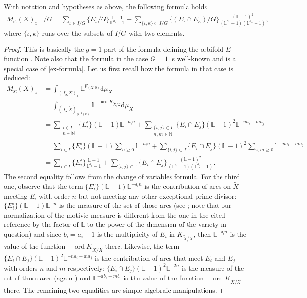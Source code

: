 \documentclass[12pt]{amsart}
\theoremstyle{plain}   %
\theoremstyle{definition}    %
\theoremstyle{remark}    %
\numberwithin{equation}{theorem}
\DeclareMathOperator{\st}{\mathrm{st}}
\DeclareMathOperator{\ord}{{ord}}
\newcommand{\bL}{\mathbb{L}}
\newcommand{\bN}{\mathbb{N}}
\begin{document}
\begin{lemma} \label{lem.SurfaceCaseDescription}
With notation and hypotheses as above, the following formula holds
\begin{align*}
M_{\st}(X)_x & /G=\sum_{\iota\in I/G}\{E_{\iota}^{\circ}/G\}\frac{\bL-1}{\bL^{a_{\iota}}-1}+\sum_{\{\iota,\kappa\}\subset I/G}\{(E_{\iota}\cap E_{\kappa}) /G\}\frac{(\bL-1)^{2}}{(\bL^{a_{\iota}}-1)(\bL^{a_{\kappa}}-1)},
\end{align*}
where $\{\iota,\kappa\}$ runs over the subsets of $I/G$ with two elements.
\end{lemma}
\begin{proof}
This is basically the $g=1$ part of the formula defining the orbifold
$E$-function \cite[Definition 6.3]{batyrevNonArchimedeanIntegralsStringy1999}. 
Note also that the formula in the case $G=1$ is well-known and is a special case of \eqref{ex-formula}. Let us first recall how the formula in that case is deduced:
\begin{align*}
M_{\st}(X)_x 
& =\int_{(J_{\infty}X)_x}\bL^{F_{(X,0)}}\mathrm{d}\mu_{X}\\
& =\int_{(J_{\infty}\tilde{X})_{\phi^{-1}(x)}}\bL^{-\ord K_{\tilde{X}/X}}\mathrm{d}\mu_{\tilde{X}}\\
& =\sum_{\substack{i\in I\\ n\in \bN}}\{E_{i}^{\circ}\}(\bL-1)\bL^{-a_{i}n}+\sum_{\substack{\{i,j\}\subset I\\ n,m \in \bN }}\{E_{i}\cap E_{j}\}(\bL-1)^{2}\bL^{-na_{i}-ma_{j}}\\
& =\sum_{i\in I}\{E_{i}^{\circ}\}(\bL-1)\sum_{n\ge 0}\bL^{-a_{i}n}+\sum_{\{i,j\}\subset I}\{E_{i}\cap E_{j}\}(\bL-1)^{2}\sum_{n,m \geq 0}\bL^{-na_{i}-ma_{j}}\\
& =\sum_{i\in I}\{E_{i}^{\circ}\}\frac{\bL-1}{\bL^{a_{i}}-1}+\sum_{\{i,j\}\subset I}\{E_{i}\cap E_{j}\}\frac{(\bL-1)^{2}}{(\bL^{a_{i}}-1)(\bL^{a_{j}}-1)}.
\end{align*}
The second equality follows from the change of variables formula. For the third one, observe that the
term $\{E_{i}^{\circ}\}(\bL-1)\bL^{-a_{i}n}$ is the contribution
of arcs on $\tilde{X}$ meeting $E_{i}$ with order $n$ but
not meeting any other exceptional prime divisor: $\{E_{i}^{\circ}\}(\bL-1)\bL^{-n}$
is the measure of the set of those arcs (see \cite[Chapter 7, Lemma 3.3.3]{ChambertLoirNicaiseSebag}; note that our normalization of the motivic measure is different from the one in the cited reference by the factor of $\bL$ to the power of the dimension of the variety in question)
and since $b_i = a_i -1$ is the multiplicity of $E_i$ in $K_{\tilde{X}/X}$, then $\bL^{-b_{i}n}$ is the
value of the function $-\ord K_{\tilde{X}/X}$ there. Likewise, the
term $\{E_{i}\cap E_{j}\}(\bL-1)^{2}\bL^{-na_{i}-ma_{j}}$ is the
contribution of arcs that meet $E_{i}$ and $E_{j}$ with orders
$n$ and $m$ respectively: $\{E_{i}\cap E_{j}\}(\bL-1)^{2}\bL^{-2n}$ is the
measure of the set of those arcs  (again \cite[Chapter 7, Lemma 3.3.3]{ChambertLoirNicaiseSebag}) and $\bL^{-nb_{i}-mb_{j}}$ is the
value of the function $-\ord K_{\tilde{X}/X}$ there. The remaining two equalities are simple algebraic manipulations.


\end{proof}
\end{document}
